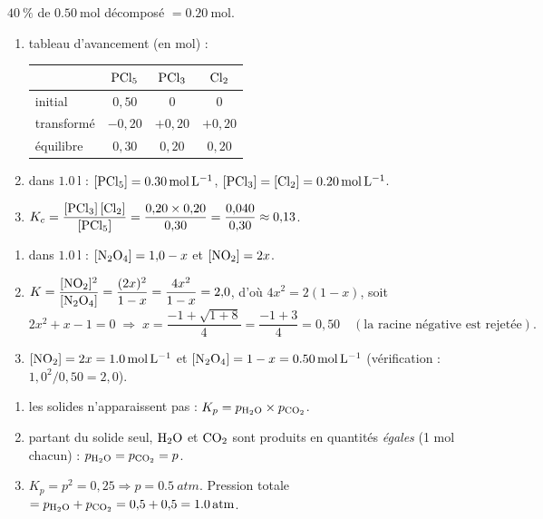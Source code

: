 \documentclass[11pt,a4paper]{article}
\begin{document}
\begin{corrige}
$\qty{40}{\percent}$ de $\qty{0.50}{\mol}$ décomposé $=\qty{0.20}{\mol}$.
\begin{enumerate}[label=\alph*)]
  \item tableau d'avancement (en $\si{\mol}$) :
  \begin{center}
  \begin{tabular}{l|ccc}
   & $\ce{PCl5}$ & $\ce{PCl3}$ & $\ce{Cl2}$\\\hline
  initial     & $0{,}50$ & $0$ & $0$\\
  transformé  & $-0{,}20$ & $+0{,}20$ & $+0{,}20$\\
  équilibre   & $0{,}30$ & $0{,}20$ & $0{,}20$\\
  \end{tabular}
  \end{center}
  \item dans $\qty{1.0}{\litre}$ : $[\ce{PCl5}]=\qty{0.30}{\mol\per\litre}$, $[\ce{PCl3}]=[\ce{Cl2}]=\qty{0.20}{\mol\per\litre}$.
  \item $K_c = \dfrac{[\ce{PCl3}]\,[\ce{Cl2}]}{[\ce{PCl5}]} = \dfrac{0{,}20\times 0{,}20}{0{,}30} = \dfrac{0{,}040}{0{,}30} \approx 0{,}13$.
\end{enumerate}
\end{corrige}

\begin{corrige}
\begin{enumerate}[label=\alph*)]
  \item dans $\qty{1.0}{\litre}$ : $[\ce{N2O4}] = 1{,}0-x$ et $[\ce{NO2}] = 2x$.
  \item $K = \dfrac{[\ce{NO2}]^{2}}{[\ce{N2O4}]} = \dfrac{(2x)^{2}}{1-x} = \dfrac{4x^{2}}{1-x} = 2{,}0$, d'où $4x^{2} = 2(1-x)$, soit
  \[ 2x^{2} + x - 1 = 0 \;\Rightarrow\; x = \frac{-1 + \sqrt{1 + 8}}{4} = \frac{-1+3}{4} = 0{,}50 \quad(\text{la racine négative est rejetée}). \]
  \item $[\ce{NO2}] = 2x = \qty{1.0}{\mol\per\litre}$ et $[\ce{N2O4}] = 1-x = \qty{0.50}{\mol\per\litre}$ (vérification : $1{,}0^{2}/0{,}50 = 2{,}0$).
\end{enumerate}
\end{corrige}

\begin{corrige}
\begin{enumerate}[label=\alph*)]
  \item les solides n'apparaissent pas : $K_p = p_{\ce{H2O}}\times p_{\ce{CO2}}$.
  \item partant du solide seul, $\ce{H2O}$ et $\ce{CO2}$ sont produits en quantités \emph{égales} (1 mol chacun) : $p_{\ce{H2O}} = p_{\ce{CO2}} = p$.
  \item $K_p = p^{2} = 0{,}25 \Rightarrow p = \qty{0.5}{atm}$. Pression totale $= p_{\ce{H2O}} + p_{\ce{CO2}} = 0{,}5 + 0{,}5 = \qty{1.0}{atm}$.
\end{enumerate}
\end{corrige}
\end{document}
